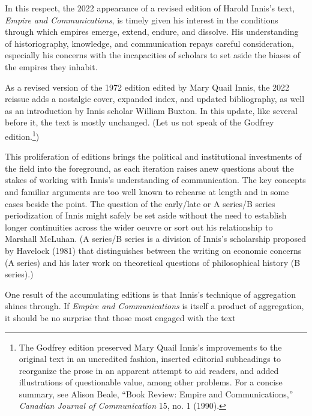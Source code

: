 \documentclass{tufte-handout}
\begin{document}
\begin{titlepage}
In this respect, the 2022 appearance of a revised edition of Harold
Innis's text, \emph{Empire and Communications}, is timely given his
interest in the conditions through which empires emerge, extend, endure,
and dissolve. His understanding of historiography, knowledge, and
communication repays careful consideration, especially his concerns with
the incapacities of scholars to set aside the biases of the empires they
inhabit.

As a revised version of the 1972 edition edited by Mary Quail Innis, the
2022 reissue adds a nostalgic cover, expanded index, and updated
bibliography, as well as an introduction by Innis scholar William
Buxton. In this update, like several before it, the text is mostly
unchanged. (Let us not speak of the Godfrey edition.\footnote{The
  Godfrey edition preserved Mary Quail Innis's improvements to the
  original text in an uncredited fashion, inserted editorial subheadings
  to reorganize the prose in an apparent attempt to aid readers, and
  added illustrations of questionable value, among other problems. For a
  concise summary, see Alison Beale, ``Book Review: Empire and
  Communications,'' \emph{Canadian Journal of Communication} 15, no. 1
  (1990).})

This proliferation of editions brings the political and
institutional investments of the field into the foreground, as each
iteration raises anew questions about the stakes of working with Innis's
understanding of communication. The key concepts and familiar arguments
are too well known to rehearse at length and in some cases beside the
point. The question of the early/late or A series/B series periodization
of Innis might safely be set aside without the need to establish longer
continuities across the wider oeuvre or sort out his relationship to
Marshall McLuhan. (A series/B series is a division of Innis's
scholarship proposed by Havelock (1981) that distinguishes between the
writing on economic concerns (A series) and his later work on
theoretical questions of philosophical history (B series).)

One result of the accumulating editions is that Innis's technique of
aggregation shines through. If \emph{Empire and Communications} is
itself a product of aggregation, it should be no surprise that those
most engaged with the text

\enlargethispage{2\baselineskip}

\vspace*{2em}



\end{titlepage}
\end{document}
